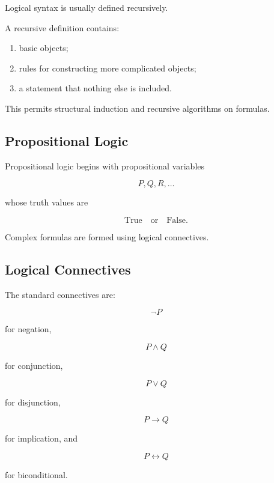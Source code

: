 Logical syntax is usually defined recursively.

A recursive definition contains:

\begin{enumerate}
    \item basic objects;
    \item rules for constructing more complicated objects;
    \item a statement that nothing else is included.
\end{enumerate}

This permits structural induction and recursive algorithms on formulas.

\subsection{Propositional Logic}
\label{subsec:formal-propositional-logic}

Propositional logic begins with propositional variables

\[
\boxed{
P,Q,R,\ldots
}
\]

whose truth values are

\[
\boxed{
\text{True}
\quad\text{or}\quad
\text{False}.
}
\]

Complex formulas are formed using logical connectives.

\subsection{Logical Connectives}
\label{subsec:formal-logical-connectives}

The standard connectives are:

\[
\boxed{
\neg P
}
\]

for negation,

\[
\boxed{
P\land Q
}
\]

for conjunction,

\[
\boxed{
P\lor Q
}
\]

for disjunction,

\[
\boxed{
P\rightarrow Q
}
\]

for implication, and

\[
\boxed{
P\leftrightarrow Q
}
\]

for biconditional.

